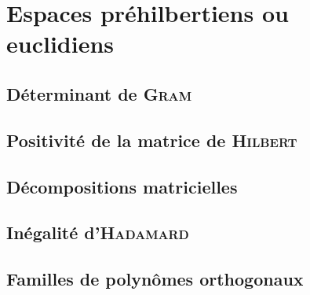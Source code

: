 \chapter{Espaces préhilbertiens ou euclidiens}



\newpage

\section{Déterminant de \textsc{Gram}} \label{matrice_gram}


\section{Positivité de la matrice de \textsc{Hilbert}}


\section{Décompositions matricielles}


\section{Inégalité d'\textsc{Hadamard}}


\section{Familles de polynômes orthogonaux}


% 

% 

